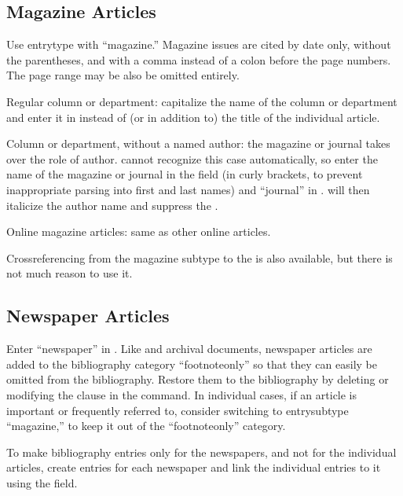 \documentclass{ltxdockit}[2010/02/12]
\begin{document}
\subsection{Magazine Articles}
Use entrytype  with  ``magazine.''
Magazine issues are cited by date only, without the parentheses, and with a comma instead of a colon before the page numbers.\autocites[][]{sokal1996a-physicist-exp} The page range may be also be omitted entirely.

Regular column or department: capitalize the name of the column or department and enter it in  instead of (or in addition to) the title of the individual article.\autocites[][]{wallraff200515}

Column or department, without a named author: the magazine or journal takes over the role of author.  cannot recognize this case automatically, so enter the name of the magazine or journal in the  field (in curly brackets, to prevent inappropriate parsing into first and last names) and ``journal'' in .  will then italicize the author name and suppress the .\autocites[][]{yorker200015}

Online magazine articles: same as other online articles.

Crossreferencing from the magazine subtype to the  is also available, but there is not much reason to use it.

\subsection{Newspaper Articles}
Enter ``newspaper'' in . Like  and archival documents, newspaper articles are added to the bibliography category ``footnoteonly'' so that they can easily be omitted from the bibliography. Restore them to the bibliography by deleting or modifying the clause  in the  command. In individual cases, if an article is important or frequently referred to, consider switching  to entrysubtype ``magazine,'' to keep it out of the ``footnoteonly'' category.

To make bibliography entries only for the newspapers, and not for the individual articles, create  entries for each newspaper and link the individual  entries to it using the  field. 
\end{document}
